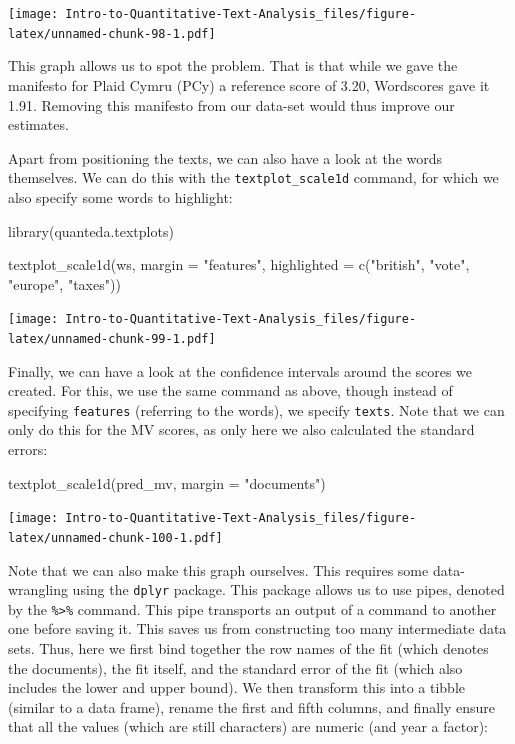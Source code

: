 \documentclass[
]{article}
\newenvironment{Shaded}{\begin{snugshade}}{\end{snugshade}}
\newcommand{\AttributeTok}[1]{\textcolor[rgb]{0.77,0.63,0.00}{#1}}
\newcommand{\FunctionTok}[1]{\textcolor[rgb]{0.00,0.00,0.00}{#1}}
\newcommand{\NormalTok}[1]{#1}
\newcommand{\StringTok}[1]{\textcolor[rgb]{0.31,0.60,0.02}{#1}}
\begin{document}
\texttt{[image: Intro-to-Quantitative-Text-Analysis\_files/figure-latex/unnamed-chunk-98-1.pdf]}

This graph allows us to spot the problem. That is that while we gave the manifesto for Plaid Cymru (PCy) a reference score of 3.20, Wordscores gave it 1.91. Removing this manifesto from our data-set would thus improve our estimates.

Apart from positioning the texts, we can also have a look at the words themselves. We can do this with the \texttt{textplot\_scale1d} command, for which we also specify some words to highlight:

\begin{Shaded}
\begin{Highlighting}[]
\FunctionTok{library}\NormalTok{(quanteda.textplots)}

\FunctionTok{textplot\_scale1d}\NormalTok{(ws, }\AttributeTok{margin =} \StringTok{"features"}\NormalTok{, }\AttributeTok{highlighted =} \FunctionTok{c}\NormalTok{(}\StringTok{"british"}\NormalTok{,}
    \StringTok{"vote"}\NormalTok{, }\StringTok{"europe"}\NormalTok{, }\StringTok{"taxes"}\NormalTok{))}
\end{Highlighting}
\end{Shaded}

\texttt{[image: Intro-to-Quantitative-Text-Analysis\_files/figure-latex/unnamed-chunk-99-1.pdf]}

Finally, we can have a look at the confidence intervals around the scores we created. For this, we use the same command as above, though instead of specifying \texttt{features} (referring to the words), we specify \texttt{texts}. Note that we can only do this for the MV scores, as only here we also calculated the standard errors:

\begin{Shaded}
\begin{Highlighting}[]
\FunctionTok{textplot\_scale1d}\NormalTok{(pred\_mv, }\AttributeTok{margin =} \StringTok{"documents"}\NormalTok{)}
\end{Highlighting}
\end{Shaded}

\texttt{[image: Intro-to-Quantitative-Text-Analysis\_files/figure-latex/unnamed-chunk-100-1.pdf]}

Note that we can also make this graph ourselves. This requires some data-wrangling using the \texttt{dplyr} package. This package allows us to use pipes, denoted by the \texttt{\%\textgreater{}\%} command. This pipe transports an output of a command to another one before saving it. This saves us from constructing too many intermediate data sets. Thus, here we first bind together the row names of the fit (which denotes the documents), the fit itself, and the standard error of the fit (which also includes the lower and upper bound). We then transform this into a tibble (similar to a data frame), rename the first and fifth columns, and finally ensure that all the values (which are still characters) are numeric (and year a factor):
\end{document}
